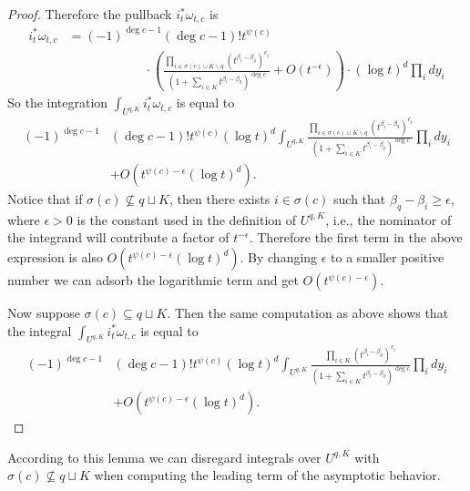 \documentclass[11pt,reqno]{amsart}
\theoremstyle{definition}
\numberwithin{equation}{section}
\begin{document}
\begin{proof}
Therefore the pullback $i_t^*\omega_{t,c}$ is
\begin{align*}
	i_t^*\omega_{t,c}&=(-1)^{\deg c-1}(\deg c-1)!t^{\psi(c)}\\
	&\qquad\qquad\qquad \cdot\left(\frac{\prod_{i\in \sigma(c)\cup K\backslash q}(t^{\beta_i-\beta_q})^{c_i}}{\left(1+\sum_{i\in K}t^{\beta_i-\beta_q}\right)^{\deg c}}+O(t^{-\epsilon})\right)\cdot(\log t)^d\prod_{i}dy_i
\end{align*}
So the integration $\int_{U^{q,K}}i_t^*\omega_{t,c}$ is equal to
\begin{align*}
	(-1)^{\deg c-1}&(\deg c-1)!t^{\psi(c)}(\log t)^d\int_{U^{q,K}}\frac{\prod_{i\in \sigma(c)\cup K\backslash q}(t^{\beta_i-\beta_q})^{c_i}}{\left(1+\sum_{i\in K}t^{\beta_i-\beta_q}\right)^{\deg c}}\prod_{i}dy_i \\
		&+ O(t^{\psi(c)-\epsilon}(\log t)^d).
\end{align*}
Notice that if $\sigma(c)\not\subseteq q\sqcup K$, then there exists $i\in\sigma(c)$ such that $\beta_q-\beta_i\geq \epsilon$, where $\epsilon>0$ is the constant used in the definition of $U^{q,K}$, i.e., the nominator of the integrand will contribute a factor of $t^{-\epsilon}$. Therefore the first term in the above expression is also $O(t^{\psi(c)-\epsilon}(\log t)^d)$. By changing $\epsilon$ to a smaller positive number we can adsorb the logarithmic term and get $O(t^{\psi(c)-\epsilon})$.

\smallskip

Now suppose $\sigma(c)\subseteq q\sqcup K$. Then the same computation as above shows that the integral $\int_{U^{q,K}}i_t^*\omega_{t,c}$ is equal to
\begin{align*}
	(-1)^{\deg c-1}&(\deg c-1)!t^{\psi(c)}(\log t)^d\int_{U^{q,K}}\frac{\prod_{i\in K}(t^{\beta_i-\beta_q})^{c_i}}{\left(1+\sum_{i\in K}t^{\beta_i-\beta_q}\right)^{\deg c}}\prod_{i}dy_i \\
		&+ O(t^{\psi(c)-\epsilon}(\log t)^d).
\end{align*}
\end{proof}

\smallskip

According to this lemma we can disregard integrals over $U^{q,K}$ with $\sigma(c)\not\subseteq q\sqcup K$ when computing the leading term of the asymptotic behavior.
\end{document}
